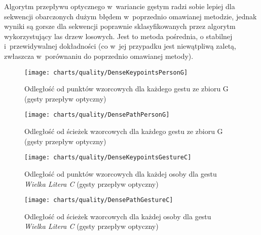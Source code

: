     Algorytm przepływu optycznego w~wariancie gęstym radzi sobie lepiej dla sekwencji obarczonych dużym błędem w~poprzednio omawianej metodzie, jednak wyniki są gorsze dla sekwencji poprawnie sklasyfikowanych przez algorytm wykorzystujący las drzew losowych. Jest to metoda pośrednia, o stabilnej i~przewidywalnej dokładności (co w~jej przypadku jest niewątpliwą zaletą, zwłaszcza w~porównaniu do poprzednio omawianej metody).

    \newpage
      \begin{figure}[!ht]
        \centering
        \texttt{[image: charts/quality/DenseKeypointsPersonG]}
        \caption[Odległość od punktów wzorcowych dla każdego gestu (gęsty przepływ optyczny)]
                {Odległość od punktów wzorcowych dla każdego gestu ze zbioru G (gęsty przepływ optyczny)}
        \label{fig:DenseKeypointsPersonG}
      \end{figure}

      \begin{figure}[!ht]
        \centering
        \texttt{[image: charts/quality/DensePathPersonG]}
        \caption[Odległość od ścieżek wzorcowych dla każdego gestu (gęsty przepływ optyczny)]
                {Odległość od ścieżek wzorcowych dla każdego gestu ze zbioru G\\(gęsty przepływ optyczny)}
        \label{fig:DensePathPersonG}
      \end{figure}

    \newpage
      \begin{figure}[!ht]
        \centering
        \texttt{[image: charts/quality/DenseKeypointsGestureC]}
        \caption[Odległość od punktów wzorcowych dla każdej osoby dla gestu C (gęsty przepływ optyczny)]
                {Odległość od punktów wzorcowych dla każdej osoby dla gestu\\\textit{Wielka Litera C} (gęsty przepływ optyczny)}
        \label{fig:DenseKeypointsGestureC}
      \end{figure}

      \begin{figure}[!ht]
        \centering
        \texttt{[image: charts/quality/DensePathGestureC]}
        \caption[Odległość od ścieżek wzorcowych dla każdej osoby dla gestu C (gęsty przepływ optyczny)]
                {Odległość od ścieżek wzorcowych dla każdej osoby dla gestu\\\textit{Wielka Litera C} (gęsty przepływ optyczny)}
        \label{fig:DensePathGestureC}
      \end{figure}

